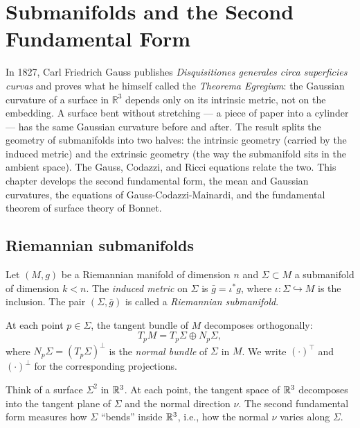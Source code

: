 \chapter{Submanifolds and the Second Fundamental Form}
\label{ch:submanifolds}

In 1827, Carl Friedrich Gauss publishes \emph{Disquisitiones generales circa superficies curvas} and proves what he himself called the \emph{Theorema Egregium}: the Gaussian curvature of a surface in $\mathbb{R}^3$ depends only on its intrinsic metric, not on the embedding. A surface bent without stretching --- a piece of paper into a cylinder --- has the same Gaussian curvature before and after. The result splits the geometry of submanifolds into two halves: the intrinsic geometry (carried by the induced metric) and the extrinsic geometry (the way the submanifold sits in the ambient space). The Gauss, Codazzi, and Ricci equations relate the two. This chapter develops the second fundamental form, the mean and Gaussian curvatures, the equations of Gauss-Codazzi-Mainardi, and the fundamental theorem of surface theory of Bonnet.

\section{Riemannian submanifolds}

\begin{definition}
Let $(M, g)$ be a Riemannian manifold of dimension $n$ and $\Sigma \subset M$
a submanifold of dimension $k < n$. The \emph{induced metric} on $\Sigma$ is
$\bar{g} = \iota^* g$, where $\iota : \Sigma \hookrightarrow M$ is the inclusion.
The pair $(\Sigma, \bar{g})$ is called a \emph{Riemannian submanifold}.
\end{definition}

\begin{definition}
At each point $p \in \Sigma$, the tangent bundle of $M$ decomposes orthogonally:
\[
    T_pM = T_p\Sigma \oplus N_p\Sigma,
\]
where $N_p\Sigma = (T_p\Sigma)^\perp$ is the \emph{normal bundle} of $\Sigma$ in $M$.
We write $(\cdot)^\top$ and $(\cdot)^\perp$ for the corresponding projections.
\end{definition}

\begin{intuition}
Think of a surface $\Sigma^2$ in $\mathbb{R}^3$. At each point, the tangent space of $\mathbb{R}^3$
decomposes into the tangent plane of $\Sigma$ and the normal direction $\nu$. The
second fundamental form measures how $\Sigma$ ``bends'' inside $\mathbb{R}^3$, i.e., how
the normal $\nu$ varies along $\Sigma$.
\end{intuition}

